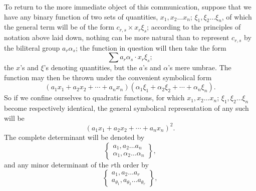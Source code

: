 \documentclass[11pt]{article}
\newcommand{\bd}[2]{\left\{\begin{matrix}#1\\#2\end{matrix}\right\}}
\begin{document}
{{To return to the more immediate object of this communication, suppose that we have any binary function of two sets of quantities, $x_1,x_2\ldots x_n$; $\xi_1,\xi_2\ldots\xi_n$, of which the general term will be of the form $c_{r,s}\times x_r\xi_s$; according to the principles of notation above laid down, nothing can be more natural than to represent $c_{r,s}$ by the biliteral group $a_r\alpha_s$; the function in question will then take the form
\[
 \sum a_r\alpha_s\cdot x_r\xi_s;
\]
the $x$'s and $\xi$'s denoting quantities, but the $a$'s and $\alpha$'s mere umbrae. The function may then be thrown under the convenient symbolical form
\[
(a_1x_1+a_2x_2+\cdots+a_nx_n)(\alpha_1\xi_1+\alpha_2\xi_2+\cdots+\alpha_n\xi_n).
\]
So if we confine ourselves to quadratic functions, for which $x_1,x_2\ldots x_n$; $\xi_1,\xi_2\ldots\xi_n$ become respectively identical, the general symbolical representation of any such will be
\[
(a_1x_1+a_2x_2+\cdots+a_nx_n)^2.
\]
The complete determinant will be denoted by
\[
\bd{a_1,a_2\ldots a_n}{\alpha_1,\alpha_2\ldots\alpha_n},
\]
and any minor determinant of the $r$th order by
\[
\bd{a_1,a_2\ldots a_r}{a_{\theta_1},a_{\theta_2}\ldots a_{\theta_r}},
\]

}}
\end{document}
